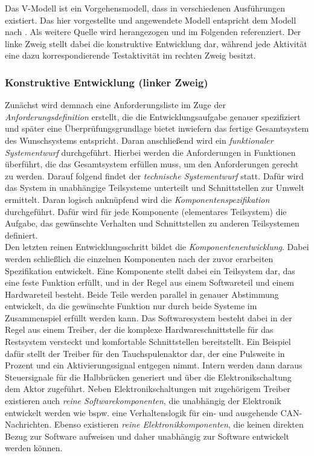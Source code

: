 Das V-Modell ist ein Vorgehensmodell, dass in verschiedenen Ausführungen existiert. Das hier vorgestellte und angewendete Modell entspricht dem Modell nach \cite{Boehm79}. Als weitere Quelle wird \cite{BasSof} herangezogen und im Folgenden referenziert.
Der linke Zweig stellt dabei die konstruktive Entwicklung dar, während jede Aktivität eine dazu korrespondierende Testaktivität im rechten Zweig besitzt. \\

\subsubsection{Konstruktive Entwicklung (linker Zweig)}
Zunächst wird demnach eine Anforderungsliste im Zuge der \textit{Anforderungsdefinition} erstellt, die die Entwicklungsaufgabe genauer spezifiziert und später eine Überprüfungsgrundlage bietet inwiefern das fertige Gesamtsystem des Wunschsystems entspricht. Daran anschließend wird ein \textit{funktionaler Systementwurf} durchgeführt. Hierbei werden die Anforderungen in Funktionen überführt, die das Gesamtsystem erfüllen muss, um den Anforderungen gerecht zu werden. Darauf folgend findet der \textit{technische Systementwurf} statt. Dafür wird das System in unabhängige Teilsysteme unterteilt und Schnittstellen zur Umwelt ermittelt. Daran logisch anknüpfend wird die \textit{Komponentenspezifikation} durchgeführt. Dafür wird für jede Komponente (elementares Teilsystem) die Aufgabe, das gewünschte Verhalten und Schnittstellen zu anderen Teilsystemen definiert. \\
Den letzten reinen Entwicklungsschritt bildet die \textit{Komponentenentwicklung}. Dabei werden schließlich die einzelnen Komponenten nach der zuvor erarbeiten Spezifikation entwickelt. Eine Komponente stellt dabei ein Teilsystem dar, das eine feste Funktion erfüllt, und in der Regel aus einem Softwareteil und einem Hardwareteil besteht. Beide Teile werden parallel in genauer Abstimmung entwickelt, da die gewünschte Funktion nur durch beide Systeme im Zusammenspiel erfüllt werden kann. Das Softwaresystem besteht dabei in der Regel aus einem Treiber, der die komplexe Hardwareschnittstelle für das Restsystem versteckt und komfortable Schnittstellen bereitstellt. Ein Beispiel dafür stellt der Treiber für den Tauchspulenaktor dar, der eine Pulsweite in Prozent und ein Aktivierungssignal entgegen nimmt. Intern werden dann daraus Steuersignale für die Halbbrücken generiert und über die Elektronikschaltung dem Aktor zugeführt.
Neben Elektronikschaltungen mit zugehörigem Treiber existieren auch \textit{reine Softwarekomponenten}, die unabhängig der Elektronik entwickelt werden wie bspw. eine Verhaltenslogik für ein- und ausgehende CAN-Nachrichten. Ebenso existieren \textit{reine Elektronikkomponenten}, die keinen direkten Bezug zur Software aufweisen und daher unabhängig zur Software entwickelt werden können.\\

